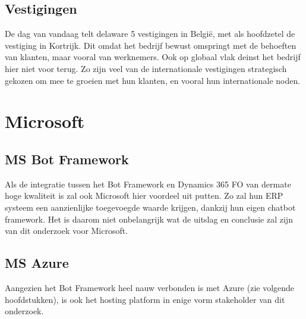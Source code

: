 \subsection{Vestigingen}
De dag van vandaag telt delaware 5 vestigingen in België, met als hoofdzetel de vestiging in Kortrijk. Dit omdat het bedrijf bewust omspringt met de behoeften van klanten, maar vooral van werknemers. 
Ook op globaal vlak deinst het bedrijf hier niet voor terug. Zo zijn veel van de internationale vestigingen strategisch gekozen om mee te groeien met hun klanten, en vooral hun internationale noden. 

\section{Microsoft}


\subsection{MS Bot Framework} 
Als de integratie tussen het Bot Framework en Dynamics 365 FO van dermate hoge kwaliteit is zal ook Microsoft hier voordeel uit putten. Zo zal hun ERP systeem een aanzienlijke toegevoegde waarde krijgen, dankzij hun eigen chatbot framework. Het is daarom niet onbelangrijk wat de uitslag en conclusie zal zijn van dit onderzoek voor Microsoft. 

\subsection{MS Azure} 
Aangezien het Bot Framework heel nauw verbonden is met Azure (zie volgende hoofdstukken), is ook het hosting platform in enige vorm stakeholder van dit onderzoek.
